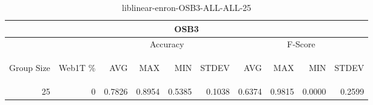 \begin{center}
\begin{table}[htbp]
\begin{tabular}{ | r | r | r | r | r | r | r | r | r | r |}
\hline
\multicolumn{10}{|c|}{OSB3}\\
\hline
 & & \multicolumn{4}{|c|}{Accuracy} & \multicolumn{4}{|c|}{F-Score}\\ \cline{3-10}
\begin{sideways}Group Size\end{sideways} & \begin{sideways}Web1T \%\end{sideways} & \begin{sideways}AVG\end{sideways} & \begin{sideways}MAX\end{sideways} & \begin{sideways}MIN\end{sideways} & \begin{sideways}STDEV\end{sideways} & \begin{sideways}AVG\end{sideways} & \begin{sideways}MAX\end{sideways} & \begin{sideways}MIN\end{sideways} & \begin{sideways}STDEV\end{sideways}\\
\hline
\multirow{0}{*}{25}
 & 0 & 0.7826 & 0.8954 & 0.5385 & 0.1038 & 0.6374 & 0.9815 & 0.0000 & 0.2599\\ \cline{2-10}
\hline
\end{tabular}
\caption{liblinear-enron-OSB3-ALL-ALL-25}
\label{table:liblinear-enron-OSB3-ALL-ALL-25}
\end{table}
\end{center}

